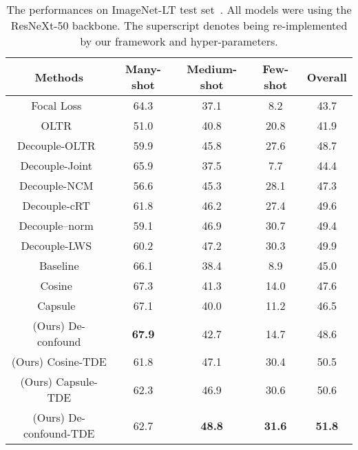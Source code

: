 \documentclass{article}
\begin{document}
\begin{table}
\centering
\scalebox{0.9}
{
\begin{tabular}{c |c |c |c |c }
\hline
\hline
Methods & Many-shot & Medium-shot & Few-shot & Overall \\ 
\hline 
Focal Loss~\cite{lin2017focal} & 64.3 & 37.1 & 8.2 & 43.7 \\
OLTR~\cite{liu2019large} & 51.0 & 40.8 & 20.8 & 41.9       \\
Decouple-OLTR~\cite{liu2019large, kang2019decoupling} & 59.9 & 45.8 & 27.6 & 48.7       \\
Decouple-Joint~\cite{kang2019decoupling} & 65.9 & 37.5 & 7.7 & 44.4 \\
Decouple-NCM~\cite{kang2019decoupling} & 56.6 & 45.3 & 28.1 & 47.3 \\
Decouple-cRT~\cite{kang2019decoupling} & 61.8 & 46.2 & 27.4 & 49.6 \\
Decouple--norm~\cite{kang2019decoupling} & 59.1 & 46.9 & 30.7 & 49.4\\
Decouple-LWS~\cite{kang2019decoupling} & 60.2 & 47.2 & 30.3 & 49.9\\
\hline
Baseline & 66.1 & 38.4 & 8.9 & 45.0 \\
Cosine~\cite{gidaris2018dynamic, qi2018low}   & 67.3 & 41.3 & 14.0 & 47.6 \\
Capsule~\cite{liu2019large, sabour2017dynamic} & 67.1 & 40.0 & 11.2 & 46.5 \\
(Ours) De-confound & \textbf{67.9} & 42.7 & 14.7 & 48.6 \\
(Ours) Cosine-TDE & 61.8 & 47.1 & 30.4 & 50.5 \\
(Ours) Capsule-TDE & 62.3 & 46.9 & 30.6 & 50.6 \\
(Ours) De-confound-TDE & 62.7 & \textbf{48.8} & \textbf{31.6} & \textbf{51.8} \\
\hline
\hline
\end{tabular}
}
\caption{The performances on ImageNet-LT test set~\cite{liu2019large}. All models were using the ResNeXt-50 backbone. The superscript  denotes being re-implemented by our framework and hyper-parameters. }
\label{tab:2}
\vspace{-5mm}
\end{table}
\end{document}
